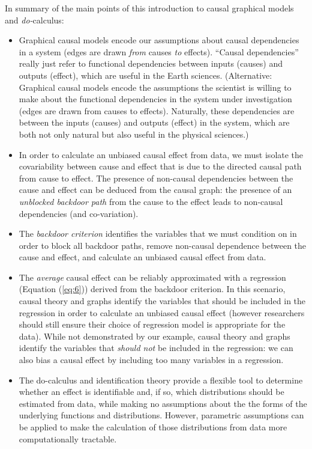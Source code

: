 \documentclass[12pt]{article}
\begin{document}
In summary of the main points of this introduction to causal graphical
models and \textit{do-}calculus:

\begin{itemize}
\item Graphical causal models encode our assumptions about causal
  dependencies in a system (edges are drawn \emph{from} causes
  \emph{to} effects). ``Causal dependencies'' really just refer to
  functional dependencies between inputs (causes) and outputs
  (effect), which are useful in the Earth sciences. (Alternative:
  Graphical causal models encode the assumptions the scientist is
  willing to make about the functional dependencies in the system
  under investigation (edges are drawn from causes to
  effects). Naturally, these dependencies are between the inputs
  (causes) and outputs (effect) in the system, which are both not only
  natural but also useful in the physical sciences.)
\item In order to calculate an unbiased causal effect from data, we
  must isolate the covariability between cause and effect that is due
  to the directed causal path from cause to effect. The presence of
  non-causal dependencies between the cause and effect can be deduced
  from the causal graph: the presence of an \textit{unblocked backdoor
    path} from the cause to the effect leads to non-causal
  dependencies (and co-variation).
\item The \emph{backdoor criterion} identifies the variables that we
  must condition on in order to block all backdoor paths, remove
  non-causal dependence between the cause and effect, and calculate an
  unbiased causal effect from data.
\item The \emph{average} causal effect can be reliably approximated
  with a regression (Equation (\ref{eq:6})) derived from the backdoor
  criterion. In this scenario, causal theory and graphs identify the
  variables that should be included in the regression in order to
  calculate an unbiased causal effect (however researchers should
  still ensure their choice of regression model is appropriate for the
  data). While not demonstrated by our example, causal theory and
  graphs identify the variables that \textit{should not} be included
  in the regression: we can also bias a causal effect by
  including too many variables in a regression.
\item The do-calculus and identification theory provide a flexible
  tool to determine whether an effect is identifiable and, if so,
  which distributions should be estimated from data, while making no
  assumptions about the the forms of the underlying functions and
  distributions. However, parametric assumptions can be applied to
  make the calculation of those distributions from data more
  computationally tractable.
\end{itemize}
\end{document}
